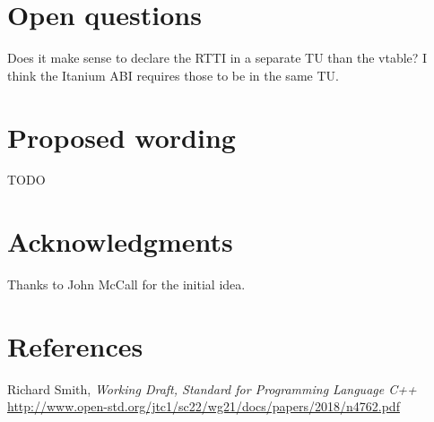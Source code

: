 \documentclass{wg21}
\begin{document}
\section{Open questions}
Does it make sense to declare the RTTI in a separate TU than the vtable?
I think the Itanium ABI requires those to be in the same TU.

\section{Proposed wording}
TODO

\section{Acknowledgments}
Thanks to John McCall for the initial idea.

\section{References}
\renewcommand{\section}[2]{}%
\begin{thebibliography}{9}

  Richard Smith,
  \emph{Working Draft, Standard for Programming Language C++}\newline
  \url{http://www.open-std.org/jtc1/sc22/wg21/docs/papers/2018/n4762.pdf}

\end{thebibliography}
\end{document}
